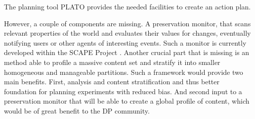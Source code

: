 The planning tool PLATO provides the needed facilities to create an action plan.

However, a couple of components are missing. A preservation monitor, that scans relevant properties of the world and evaluates their values for changes, eventually notifying users or other agents of interesting events. Such a monitor is currently developed within the SCAPE Project \cite{becker-ipres2012}.
Another crucial part that is missing is an method able to profile a massive content set and stratify it into smaller homogeneous and manageable partitions. Such a framework would provide two main benefits. First, analysis and content stratification and thus better foundation for planning experiments with reduced bias. And second input to a preservation monitor that will be able to create a global profile of content, which would be of great benefit to the DP community.

